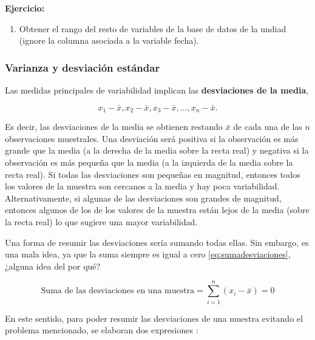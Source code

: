 \documentclass[
]{book}
\providecommand{\tightlist}{%
  \setlength{\itemsep}{0pt}\setlength{\parskip}{0pt}}
\begin{document}
\textbf{Ejercicio:}

\begin{enumerate}
\def\labelenumi{\arabic{enumi}.}
\tightlist
\item
  Obtener el rango del resto de variables de la base de datos de la undiad (ignore la columna asociada a la variable fecha).
\end{enumerate}

\hypertarget{varianza-y-desviaciuxf3n-estuxe1ndar}{%
\subsubsection*{Varianza y desviación estándar}\label{varianza-y-desviaciuxf3n-estuxe1ndar}}

Las medidas principales de variabilidad implican las \textbf{desviaciones de la media},

\begin{equation}
x_1 - \bar{x}, x_2 - \bar{x}, x_3 - \bar{x}, \ldots, x_n - \bar{x}.
\label{eq:desviaciones}
\end{equation}

Es decir, las desviaciones de la media se obtienen restando \(\bar{x}\) de cada una de las \(n\) observaciones muestrales. Una desviación será positiva si la observación es más grande que la media (a la derecha de la media sobre la recta real) y negativa si la observación es más pequeña que la media (a la izquierda de la media sobre la recta real). Si todas las desviaciones son pequeñas en magnitud, entonces todos los valores de la muestra son cercanos a la media y hay poca variabilidad. Alternativamente, si algunas de las desviaciones son grandes de magnitud, entonces algunos de los de los valores de la muestra están lejos de la media (sobre la recta real) lo que sugiere una mayor variabilidad.

Una forma de resumir las desviaciones sería sumando todas ellas. Sin embargo, es una mala idea, ya que la suma siempre es igual a cero \eqref{eq:sumadesviaciones}, ¿alguna idea del por qué?

\begin{equation}
\text{Suma de las desviaciones en una muestra} = \sum_{i=1}^{n}(x_i-\bar{x}) = 0
\label{eq:sumadesviaciones}
\end{equation}

En este sentido, para poder resumir las desviaciones de una muestra evitando el problema mencionado, se elaboran dos expresiones \citep[página 32]{Devore}:
\end{document}
